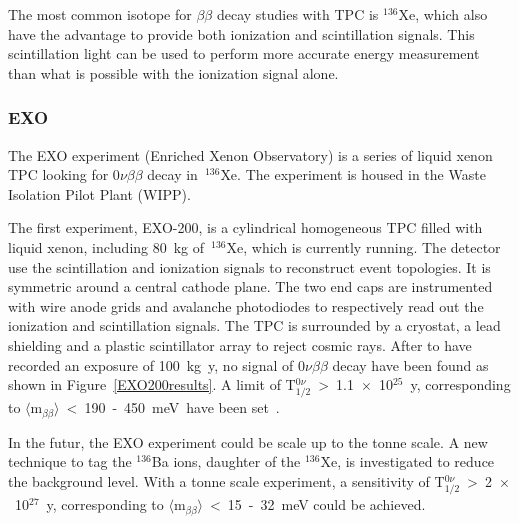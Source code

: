 \documentclass[main.tex]{subfiles}
\begin{document}
\bigskip


\NI The most common isotope for $\beta\beta$ decay studies with TPC is $^{\text{136}}$Xe, which also have the advantage to provide both ionization and scintillation signals. This scintillation light can be used to perform more accurate energy measurement than what is possible with the ionization signal alone.    


\subsubsection{EXO}


\NI The EXO experiment (Enriched Xenon Observatory) is a series of liquid xenon TPC looking for 0$\nu\beta\beta$ decay in~$^{\text{136}}$Xe. The experiment is housed in the Waste Isolation Pilot Plant (WIPP). 


\bigskip


\NI The first experiment, EXO-200, is a cylindrical homogeneous TPC filled with liquid xenon, including 80~kg of~$^{\text{136}}$Xe, which is currently running. The detector use the scintillation and ionization signals to reconstruct event topologies. It is symmetric around a central cathode plane. The two end caps are instrumented with wire anode grids and avalanche photodiodes to respectively read out the ionization and scintillation signals. The TPC is surrounded by a cryostat, a lead shielding and a plastic scintillator array to reject cosmic rays. After to have recorded an exposure of 100~kg~y, no signal of 0$\nu\beta\beta$ decay have been found as shown in Figure~\ref{EXO200results}. A limit of T$_{\text{1/2}}^{0\nu}$~>~1.1~$\times$~10$^{\text{25}}$~y, corresponding to $\langle \text{m}_{\beta\beta} \rangle$~<~190~-~450~meV~have been set~\cite{EXO-200}. 


\bigskip


\NI In the futur, the EXO experiment could be scale up to the tonne scale. A new technique to tag the $^{\text{136}}$Ba ions, daughter of the $^{\text{136}}$Xe, is investigated to reduce the background level. With a tonne scale experiment, a sensitivity of T$_{\text{1/2}}^{0\nu}$~>~2~$\times$~10$^{\text{27}}$~y, corresponding to $\langle \text{m}_{\beta\beta} \rangle$~<~15~-~32~meV could be achieved.
\end{document}
